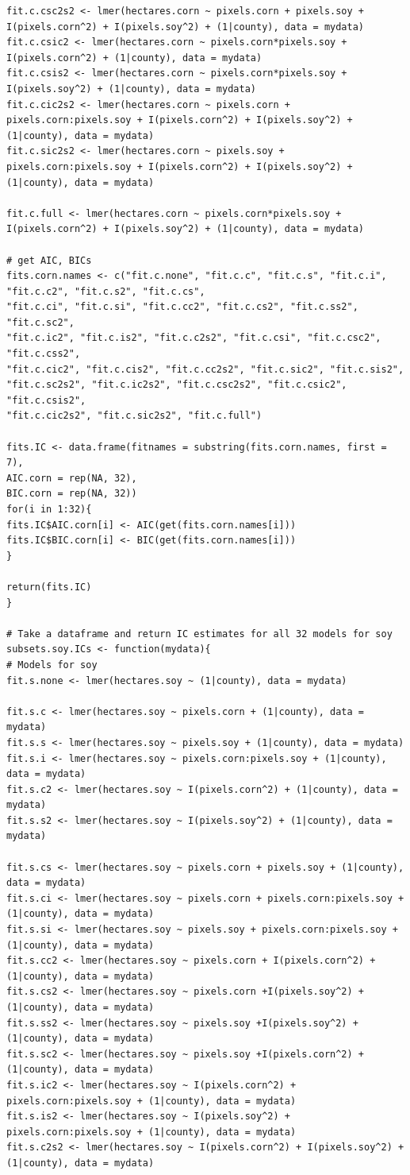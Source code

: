 \documentclass{article}
\begin{document}
\begin{Verbatim}[fontsize=\tiny]
fit.c.csc2s2 <- lmer(hectares.corn ~ pixels.corn + pixels.soy + I(pixels.corn^2) + I(pixels.soy^2) + (1|county), data = mydata)
fit.c.csic2 <- lmer(hectares.corn ~ pixels.corn*pixels.soy + I(pixels.corn^2) + (1|county), data = mydata)
fit.c.csis2 <- lmer(hectares.corn ~ pixels.corn*pixels.soy + I(pixels.soy^2) + (1|county), data = mydata)
fit.c.cic2s2 <- lmer(hectares.corn ~ pixels.corn + pixels.corn:pixels.soy + I(pixels.corn^2) + I(pixels.soy^2) + (1|county), data = mydata)
fit.c.sic2s2 <- lmer(hectares.corn ~ pixels.soy + pixels.corn:pixels.soy + I(pixels.corn^2) + I(pixels.soy^2) + (1|county), data = mydata)

fit.c.full <- lmer(hectares.corn ~ pixels.corn*pixels.soy + I(pixels.corn^2) + I(pixels.soy^2) + (1|county), data = mydata)

# get AIC, BICs
fits.corn.names <- c("fit.c.none", "fit.c.c", "fit.c.s", "fit.c.i", "fit.c.c2", "fit.c.s2", "fit.c.cs",
"fit.c.ci", "fit.c.si", "fit.c.cc2", "fit.c.cs2", "fit.c.ss2", "fit.c.sc2",
"fit.c.ic2", "fit.c.is2", "fit.c.c2s2", "fit.c.csi", "fit.c.csc2", "fit.c.css2",
"fit.c.cic2", "fit.c.cis2", "fit.c.cc2s2", "fit.c.sic2", "fit.c.sis2",
"fit.c.sc2s2", "fit.c.ic2s2", "fit.c.csc2s2", "fit.c.csic2", "fit.c.csis2",
"fit.c.cic2s2", "fit.c.sic2s2", "fit.c.full")

fits.IC <- data.frame(fitnames = substring(fits.corn.names, first = 7),
AIC.corn = rep(NA, 32),
BIC.corn = rep(NA, 32))
for(i in 1:32){
fits.IC$AIC.corn[i] <- AIC(get(fits.corn.names[i]))
fits.IC$BIC.corn[i] <- BIC(get(fits.corn.names[i]))
}

return(fits.IC)
}

# Take a dataframe and return IC estimates for all 32 models for soy
subsets.soy.ICs <- function(mydata){
# Models for soy
fit.s.none <- lmer(hectares.soy ~ (1|county), data = mydata)

fit.s.c <- lmer(hectares.soy ~ pixels.corn + (1|county), data = mydata)
fit.s.s <- lmer(hectares.soy ~ pixels.soy + (1|county), data = mydata)
fit.s.i <- lmer(hectares.soy ~ pixels.corn:pixels.soy + (1|county), data = mydata)
fit.s.c2 <- lmer(hectares.soy ~ I(pixels.corn^2) + (1|county), data = mydata)
fit.s.s2 <- lmer(hectares.soy ~ I(pixels.soy^2) + (1|county), data = mydata)

fit.s.cs <- lmer(hectares.soy ~ pixels.corn + pixels.soy + (1|county), data = mydata)
fit.s.ci <- lmer(hectares.soy ~ pixels.corn + pixels.corn:pixels.soy + (1|county), data = mydata)
fit.s.si <- lmer(hectares.soy ~ pixels.soy + pixels.corn:pixels.soy + (1|county), data = mydata)
fit.s.cc2 <- lmer(hectares.soy ~ pixels.corn + I(pixels.corn^2) + (1|county), data = mydata)
fit.s.cs2 <- lmer(hectares.soy ~ pixels.corn +I(pixels.soy^2) + (1|county), data = mydata)
fit.s.ss2 <- lmer(hectares.soy ~ pixels.soy +I(pixels.soy^2) + (1|county), data = mydata)
fit.s.sc2 <- lmer(hectares.soy ~ pixels.soy +I(pixels.corn^2) + (1|county), data = mydata)
fit.s.ic2 <- lmer(hectares.soy ~ I(pixels.corn^2) + pixels.corn:pixels.soy + (1|county), data = mydata)
fit.s.is2 <- lmer(hectares.soy ~ I(pixels.soy^2) + pixels.corn:pixels.soy + (1|county), data = mydata)
fit.s.c2s2 <- lmer(hectares.soy ~ I(pixels.corn^2) + I(pixels.soy^2) + (1|county), data = mydata)


\end{Verbatim}
\end{document}
